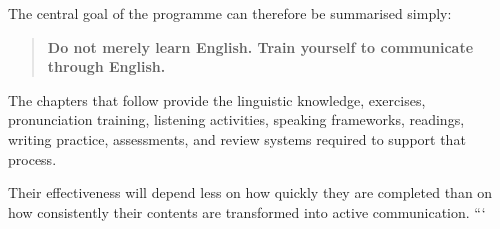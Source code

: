The central goal of the programme can therefore be summarised simply:

\begin{quote}
\centering
\Large
\textbf{Do not merely learn English. Train yourself to communicate through English.}
\end{quote}

\vspace{0.5cm}

The chapters that follow provide the linguistic knowledge, exercises, pronunciation training, listening activities, speaking frameworks, readings, writing practice, assessments, and review systems required to support that process.

Their effectiveness will depend less on how quickly they are completed than on how consistently their contents are transformed into active communication.
```